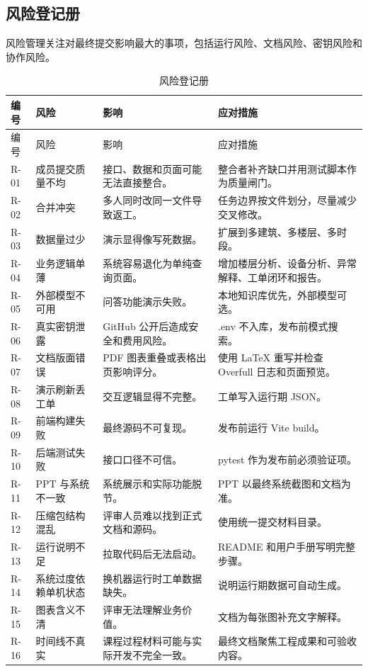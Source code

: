 \documentclass[12pt,a4paper]{ctexart}
\begin{document}
\subsection{风险登记册}
风险管理关注对最终提交影响最大的事项，包括运行风险、文档风险、密钥风险和协作风险。
\begin{longtable}{L{1.6cm}L{3.0cm}L{4.8cm}L{4.8cm}}
\caption{风险登记册}\\
\toprule
编号 & 风险 & 影响 & 应对措施 \\
\midrule
\endfirsthead
\toprule
编号 & 风险 & 影响 & 应对措施 \\
\midrule
\endhead
R-01 & 成员提交质量不均 & 接口、数据和页面可能无法直接整合。 & 整合者补齐缺口并用测试脚本作为质量闸门。 \\
R-02 & 合并冲突 & 多人同时改同一文件导致返工。 & 任务边界按文件划分，尽量减少交叉修改。 \\
R-03 & 数据量过少 & 演示显得像写死数据。 & 扩展到多建筑、多楼层、多时段。 \\
R-04 & 业务逻辑单薄 & 系统容易退化为单纯查询页面。 & 增加楼层分析、设备分析、异常解释、工单闭环和报告。 \\
R-05 & 外部模型不可用 & 问答功能演示失败。 & 本地知识库优先，外部模型可选。 \\
R-06 & 真实密钥泄露 & GitHub 公开后造成安全和费用风险。 & .env 不入库，发布前模式搜索。 \\
R-07 & 文档版面错误 & PDF 图表重叠或表格出页影响评分。 & 使用 LaTeX 重写并检查 Overfull 日志和页面预览。 \\
R-08 & 演示刷新丢工单 & 交互逻辑显得不完整。 & 工单写入运行期 JSON。 \\
R-09 & 前端构建失败 & 最终源码不可复现。 & 发布前运行 Vite build。 \\
R-10 & 后端测试失败 & 接口口径不可信。 & pytest 作为发布前必须验证项。 \\
R-11 & PPT 与系统不一致 & 系统展示和实际功能脱节。 & PPT 以最终系统截图和文档为准。 \\
R-12 & 压缩包结构混乱 & 评审人员难以找到正式文档和源码。 & 使用统一提交材料目录。 \\
R-13 & 运行说明不足 & 拉取代码后无法启动。 & README 和用户手册写明完整步骤。 \\
R-14 & 系统过度依赖单机状态 & 换机器运行时工单数据缺失。 & 说明运行期数据可自动生成。 \\
R-15 & 图表含义不清 & 评审无法理解业务价值。 & 文档为每张图补充文字解释。 \\
R-16 & 时间线不真实 & 课程过程材料可能与实际开发不完全一致。 & 最终文档聚焦工程成果和可验收内容。 \\
\bottomrule
\end{longtable}
\end{document}
